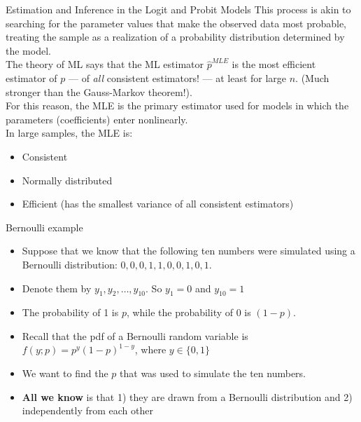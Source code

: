 \documentclass[notes,10pt, aspectratio=169]{beamer}
\begin{document}
\begin{frame}{Estimation and Inference in the Logit and Probit Models}
This process is akin to searching for the parameter values that make the observed data most probable, treating the sample as a realization of a probability distribution determined by the model.\\[1em]
The theory of ML says that the ML estimator $\hat{p}^{MLE}$ is the most efficient estimator of $p$ --- of \textit{all} consistent estimators! --- at least for large $n$. (Much stronger than the Gauss-Markov theorem!).\\[1em]
For this reason, the MLE is the primary estimator used for models in which the parameters (coefficients) enter nonlinearly. \\[1em]
In large samples, the MLE is:
\begin{itemize}
    \item Consistent
    \item Normally distributed
    \item Efficient (has the smallest variance of all consistent estimators)
\end{itemize}



\end{frame}



\begin{frame}{Bernoulli example}
  \begin{itemize}
    \item Suppose that we know that the following ten numbers were simulated using a Bernoulli distribution: $0, 0, 0, 1, 1, 0, 0, 1, 0, 1$.\\[1em]
    \item Denote them by $y_1, y_2, \ldots, y_{10}$. So $y_1=0$ and $y_{10}=1$\\[1em]
    \item The probability of 1 is $p$, while the probability of 0 is $(1 - p)$.\\[1em]
    \item Recall that the pdf of a Bernoulli random variable is $f(y; p) = p^y (1 - p)^{1-y}$, where $y \in \{0, 1\}$\\[1em]
    \item We want to find the $p$ that was used to simulate the ten numbers.\\[1em]
    \item \textbf{All we know} is that 1) they are drawn from a Bernoulli distribution and 2) independently from each other
  \end{itemize}
\end{frame}
\end{document}
